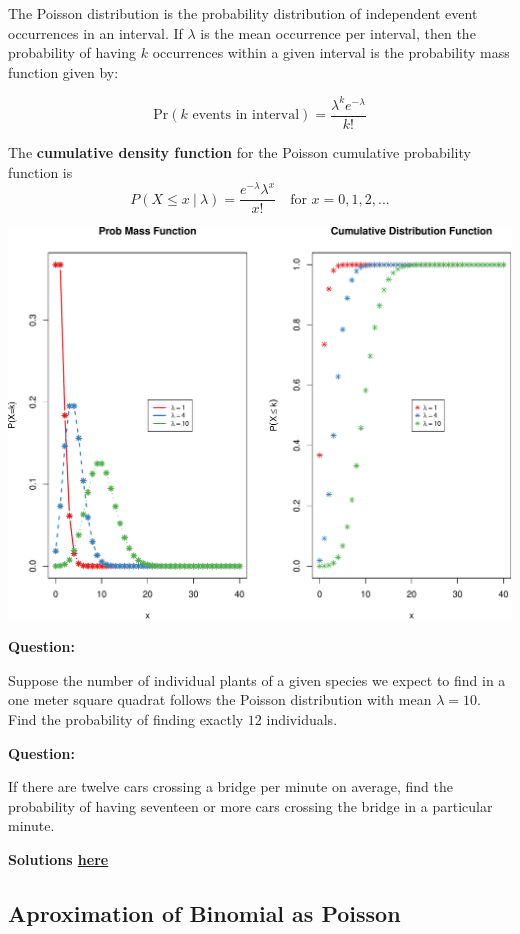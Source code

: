 \documentclass[]{article}
\numberwithin{equation}{section}
\begin{document}
The Poisson distribution is the probability distribution of independent
event occurrences in an interval. If \(\lambda\) is the mean occurrence
per interval, then the probability of having \(k\) occurrences within a
given interval is the probability mass function given by:

\[
\mbox{Pr}(\mbox{$k$ events in interval}) = \frac{\lambda^k e^{-\lambda}}{k!}
\]

The \textbf{cumulative density function} for the Poisson cumulative
probability function is \[
P(X\leq x ~|~\lambda ) = \frac{e^{-\lambda} \lambda ^x}{x!}\quad \mbox{for $x=0,1,2,...$}
\]

\includegraphics{index_files/figure-latex/unnamed-chunk-146-1.pdf}

\textbf{Question:}

Suppose the number of individual plants of a given species we expect to
find in a one meter square quadrat follows the Poisson distribution with
mean \(\lambda= 10\). Find the probability of finding exactly \(12\)
individuals.

\textbf{Question:}

If there are twelve cars crossing a bridge per minute on average, find
the probability of having seventeen or more cars crossing the bridge in
a particular minute.

\textbf{Solutions \href{IntroSM_sol.html}{here}}

\subsection{Aproximation of Binomial as
Poisson}\label{aproximation-of-binomial-as-poisson}
\end{document}
